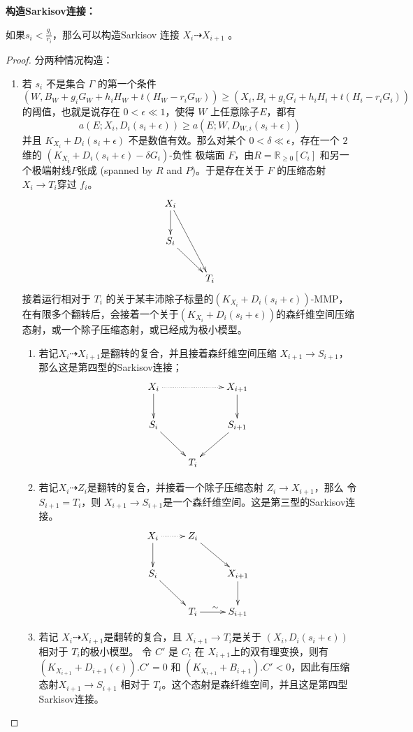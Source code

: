 \textbf{构造Sarkisov连接：}
\begin{proposition}[构造Sarkisov 连接]\label{2Constructlink}
 如果$s_{i}<\frac{g_{i}}{r_{i}}$，那么可以构造Sarkisov 连接 $X_{i}\dashrightarrow X_{i+1}$ 。
\end{proposition}
\begin{proof}
  分两种情况构造：
  \begin{enumerate}
  \item 若 $s_{i}$ 不是集合 $\Gamma$ 的第一个条件
    \[\left(W,B_{W}+g_{i}G_{W}+h_{i}H_{W}+t(H_{W}-r_{i}G_{W})\right)\geqslant \left(X_{i},B_{i}+g_{i}G_{i}+h_{i}H_{i}+t\left(H_{i}-r_{i}G_{i}\right)\right)\]
    的阈值，也就是说存在 $0<\epsilon\ll 1$，使得 $W$ 上任意除子$E$，都有
  \[ a(E;X_{i},D_{i}(s_{i}+\epsilon))\geqslant a(E;W,D_{W,i}(s_{i}+\epsilon)) \]
  并且 $K_{X_{i}}+D_{i}(s_{i}+\epsilon)$ 不是数值有效。那么对某个 $0< \delta \ll \epsilon $，存在一个 $2$ 维的 $(K_{X_{i}}+D_{i}(s_{i}+\epsilon)-\delta G_{i})$-负性 极端面 $F$，由$R=\mathbb{R}_{\geqslant 0}[C_{i}]$ 和另一个极端射线$P$张成 (spanned by $R$ and $P$)。于是存在关于 $F$   的压缩态射$X_{i}\to T_{i}$穿过 $f_{i}$。 
  \[ \xymatrix{
      X_{i}\ar[d]\ar[rdd]& \\
      S_{i}\ar[rd]&\\
         &T_{i} } \]
  接着运行相对于 $T_{i}$ 的关于某丰沛除子标量的$(K_{X_{i}}+D_{i}(s_{i}+\epsilon))$-MMP，在有限多个翻转后，会接着一个关于$(K_{X_{i}}+D_{i}(s_{i}+\epsilon))$的森纤维空间压缩态射，或一个除子压缩态射，或已经成为极小模型。
  \begin{enumerate}
    \item  若记$X_{i}\dashrightarrow X_{i+1}$是翻转的复合，并且接着森纤维空间压缩 $X_{i+1}\to S_{i+1}$，那么这是第四型的Sarkisov连接；
      \[ \xymatrix{
          X_{i}\ar@{.>}[rr]\ar[d]& &X_{i+1}\ar[d] \\
          S_{i}\ar[rd]& & S_{i+1}\ar[ld]\\
             &T_{i}& } \]
    \item 若记$X_{i}\dashrightarrow Z_{i}$是翻转的复合，并接着一个除子压缩态射 $Z_{i}\to X_{i+1}$，那么 令 $S_{i+1}=T_{i}$，则 $X_{i+1}\to S_{i+1}$是一个森纤维空间。这是第三型的Sarkisov连接。
      \[ \xymatrix{
          X_{i}\ar@{.>}[r]\ar[d]& Z_{i}\ar[rd] \\
          S_{i}\ar[rd]& & X_{i+1}\ar[d]\\
               &T_{i}\ar[r]^{\sim}& S_{i+1} } \]
    \item 若记 $X_{i}\dashrightarrow X_{i+1}$是翻转的复合，且 $X_{i+1}\to T_{i}$是关于 $\left(X_{i},D_{i}\left(s_{i}+\epsilon\right)\right)$ 相对于 $T_{i}$的极小模型。 令  $C'$ 是  $C_{i}$ 在 $X_{i+1}$上的双有理变换，则有 $(K_{X_{i+1}}+D_{i+1}(\epsilon)).C'=0$ 和 $(K_{X_{i+1}}+B_{i+1}).C'<0$，因此有压缩态射$X_{i+1} \to S_{i+1}$ 相对于 $T_i$。这个态射是森纤维空间，并且这是第四型Sarkisov连接。

\end{enumerate}
\end{enumerate}
\end{proof}
